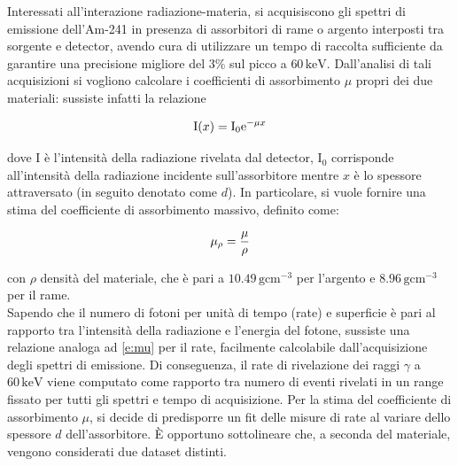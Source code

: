 \documentclass[twocolumn,10pt]{asme2ej}
\begin{document}
Interessati all'interazione radiazione-materia, si acquisiscono gli spettri di emissione dell'Am-241 in presenza di
assorbitori di rame o argento interposti tra sorgente e detector, avendo cura di utilizzare un tempo di raccolta
sufficiente da garantire una precisione migliore del $3\%$ sul picco a $60\,\si{\kilo\electronvolt}$. Dall'analisi di
tali acquisizioni si vogliono calcolare i coefficienti di assorbimento $\mu$ propri dei due materiali: sussiste infatti
la relazione

\vspace{-15pt}
\begin{equation}
   \text{I}(x) = \text{I}_0 \text{e}^{-\mu x}
    \label{e:mu}
    \vspace{-5pt}
\end{equation}

\noindent dove I è l'intensità della radiazione rivelata dal detector, $\text{I}_0$ corrisponde all'intensità della
radiazione incidente sull'assorbitore mentre $x$ è lo spessore attraversato (in seguito denotato come $d$). In
particolare, si vuole fornire una stima del coefficiente di assorbimento massivo, definito come:

\vspace{-15pt}
\begin{equation}
   \mu_{\rho} = \frac{\mu}{\rho}
    \vspace{-5pt}
    \label{e:mu_mass}
\end{equation}

con $\rho$ densità del materiale, che è pari a $10.49\,\si{\gram \centi\metre^{-3}}$ per l'argento e $8.96\,\si{\gram
\centi\metre^{-3}}$ per il rame. \\ 



Sapendo che il numero di fotoni per unità di tempo (rate) e superficie è pari al rapporto tra l'intensità della
radiazione e l'energia del fotone, sussiste una relazione analoga ad \autoref{e:mu} per il rate, facilmente calcolabile
dall'acquisizione degli spettri di emissione. Di conseguenza, il rate di rivelazione dei raggi $\gamma$ a
$60\,\si{\kilo\electronvolt}$ viene computato come rapporto tra numero di eventi rivelati in un range fissato per tutti
gli spettri e tempo di acquisizione. Per la stima del coefficiente di assorbimento $\mu$, si decide di predisporre un
fit delle misure di rate al variare dello spessore $d$ dell'assorbitore. È opportuno sottolineare che, a seconda del
materiale, vengono considerati due dataset distinti. 
\end{document}
